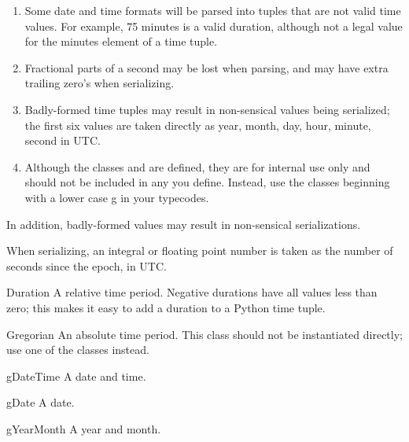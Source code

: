 \begin{enumerate}

\item
Some date and time formats will be parsed into tuples that are
not valid time values.
For example, 75 minutes is a valid duration, although not a legal value
for the minutes element of a time tuple.

\item
Fractional parts of a second may be lost when parsing, and may have
extra trailing zero's when serializing.

\item
Badly-formed time tuples may result in non-sensical values being serialized;
the first six values are taken directly as year, month, day, hour, minute,
second in UTC.

\item
Although the classes  and  are defined, they
are for internal use only and should not be included in any 
you define.  Instead, use the classes beginning with a lower case g in your
typecodes.

\end{enumerate}

In addition, badly-formed values may result in non-sensical serializations.

When serializing, an integral or floating point number is taken as
the number of seconds since the epoch, in UTC.

\begin{classdesc}{Duration}{}
A relative time period.
Negative durations have all values less than zero; this makes
it easy to add a duration to a Python time tuple.
\end{classdesc}

\begin{classdesc}{Gregorian}{}
An absolute time period.
This class should not be instantiated directly; use one of the 
classes instead.
\end{classdesc}

\begin{classdesc}{gDateTime}{}
A date and time.
\end{classdesc}

\begin{classdesc}{gDate}{}
A date.
\end{classdesc}

\begin{classdesc}{gYearMonth}{}
A year and month.
\end{classdesc}


